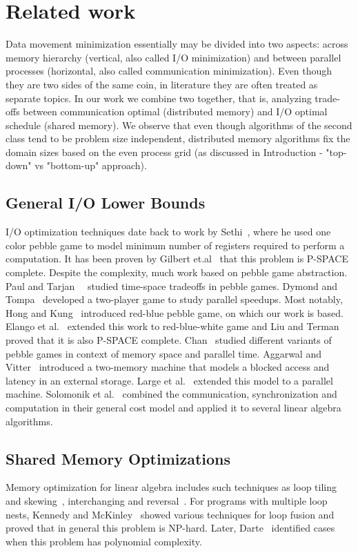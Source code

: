 \documentclass[sigplan,review,anonymous,10pt]{acmart}\settopmatter{printfolios=true,printccs=false,printacmref=false}
\begin{document}
\section{Related work}

Data movement minimization essentially may be divided into two aspects: across 
memory hierarchy (vertical, also called I/O minimization) and between parallel 
processes (horizontal, also called communication minimization). Even though 
they are two sides of the same coin, in literature they are often treated as 
separate topics. In our work we combine two together, that is, analyzing 
trade-offs between 
communication optimal (distributed memory) and I/O optimal schedule 
(shared memory). We observe that even though algorithms of the second class 
tend to be problem size independent, distributed memory algorithms fix the 
domain sizes based on the even process grid (as discussed in Introduction - 
"top-down" vs "bottom-up" approach).

\subsection{General I/O Lower Bounds}
I/O optimization techniques date back to work by 
Sethi~\cite{completeRegisterProblems}, where he used one color pebble game to 
model minimum number of registers required to perform a computation. It has 
been proven by Gilbert et.al~\cite{pebblegameregister} that this problem is 
P-SPACE complete. Despite the complexity, much work based on pebble game 
abstraction. Paul and Tarjan~~\cite{pebbleTradeoffs} studied time-space 
tradeoffs in pebble games. Dymond and Tompa~\cite{dymond2playerpebblegame} 
developed a 
two-player game to study parallel speedups. Most notably, Hong and 
Kung~\cite{redblue} introduced red-blue pebble game, on which our work is 
based. Elango et al.~\cite{redbluewhite} extended this work to red-blue-white 
game and Liu and Terman~\cite{redblueHard} proved that it is also P-SPACE 
complete. Chan~\cite{justApebbleGame} studied different variants of pebble 
games in context of memory space and parallel time. Aggarwal and 
Vitter~\cite{externalMem}
introduced a two-memory machine that models a blocked access and latency in an
external storage. Large et al.~\cite{parallelExMem} extended this model to a 
parallel machine. Solomonik et al.~\cite{edgarTradeoff} combined the 
communication, synchronization and computation in their general cost model and 
applied 
it to several linear algebra algorithms.

\subsection{Shared Memory Optimizations}
Memory optimization for linear algebra includes such techniques as loop tiling 
and skewing~\cite{tiling}, interchanging and reversal~\cite{tiling2}. For 
programs with multiple loop nests, Kennedy and McKinley~\cite{loopFusion} 
showed various techniques for loop fusion and proved that in general this 
problem is NP-hard. Later, 
Darte~\cite{loopFusionComplexity} identified cases when this problem has 
polynomial complexity.
\end{document}
